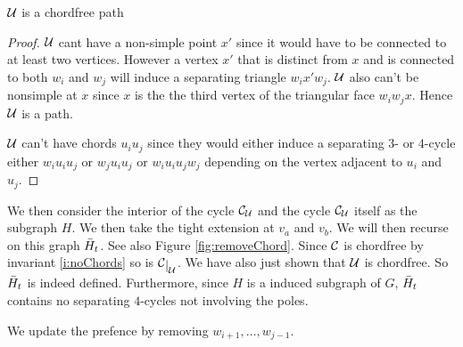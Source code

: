     \begin{lemma}
    $\mathcal{U}$ is a chordfree path
    \end{lemma}
    \begin{proof}

    $\mathcal{U}$ cant have a non-simple point $x'$ since it would have to be connected to at least two vertices. However a vertex $x'$ that is distinct from $x$ and is connected to both $w_i$ and $w_j$ will induce a separating triangle $w_i x' w_j$. $\mathcal{U}$ also can't be nonsimple at $x$ since $x$ is the the third vertex of the triangular face $w_i w_j x$. Hence $\mathcal{U}$ is a path.


    $\mathcal{U}$ can't have chords $u_i u_j$ since they would either induce a separating $3$- or $4$-cycle either $w_i u_i u_j$ or $w_j u_i u_j$ or $w_i u_i u_j w_j$ depending on the vertex adjacent to $u_i$ and $u_j$.
    \end{proof}


    We then consider the interior of the cycle $\mathcal{C}_{\mathcal{U}}$ and the cycle $\mathcal{C}_{\mathcal{U}}$ itself as the subgraph $H$. We then take the tight extension at $v_a$ and $v_b$. We will then recurse on this graph $\bar{H}_t$. See also Figure \ref{fig:removeChord}. Since $\mathcal{C}$ is chordfree by invariant \ref{i:noChords} so is $\restC{\U}$. We have also just shown that $\mathcal{U}$ is chordfree. So $\bar{H}_t$ is indeed defined. Furthermore, since $H$ is a induced subgraph of $G$, $\bar{H}_t$ contains no separating $4$-cycles not involving the poles.

    We update the prefence by removing $w_{i+1}, \ldots, w_{j-1}$.

